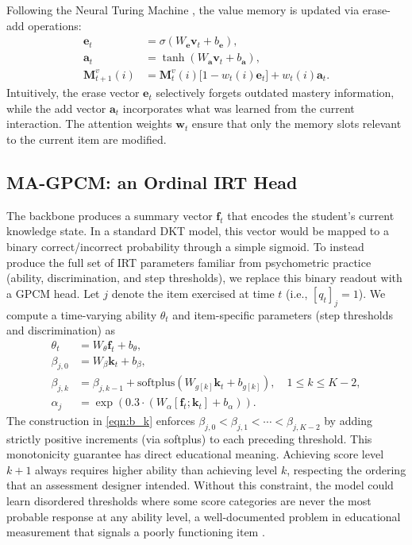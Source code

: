 \documentclass[pdflatex,sn-apa]{sn-jnl}
\begin{document}
Following the Neural Turing Machine \citep{graves_neural_2014}, the value memory is updated via erase-add operations:
\begin{align}
\mathbf{e}_t&=\sigma(W_{\mathbf{e}}\mathbf{v}_t+b_{\mathbf{e}}),\label{eqn:erase_vec}\\
\mathbf{a}_t&=\tanh(W_{\mathbf{a}}\mathbf{v}_t+b_{\mathbf{a}}),\label{eqn:add_vec}\\
\mathbf{M}_{t+1}^v(i)&=\mathbf{M}_{t}^v(i)\bigl[1-w_t(i)\mathbf{e}_t\bigr]+w_t(i)\mathbf{a}_t.\label{eqn:value_memory_update}
\end{align}
Intuitively, the erase vector $\mathbf{e}_t$ selectively forgets outdated mastery information, while the add vector $\mathbf{a}_t$ incorporates what was learned from the current interaction. The attention weights $\mathbf{w}_t$ ensure that only the memory slots relevant to the current item are modified.

\subsection{MA-GPCM: an Ordinal IRT Head}
\label{sec:gpcm_head}
The backbone produces a summary vector $\mathbf{f}_t$ that encodes the student's current knowledge state. In a standard DKT model, this vector would be mapped to a binary correct/incorrect probability through a simple sigmoid. To instead produce the full set of IRT parameters familiar from psychometric practice (ability, discrimination, and step thresholds), we replace this binary readout with a GPCM head.
Let $j$ denote the item exercised at time $t$ (i.e., $[q_t]_j=1$).
We compute a time-varying ability $\theta_t$ and item-specific parameters (step thresholds and discrimination) as
\begin{align}
    \theta_t &= W_{\theta}\mathbf{f}_t+b_{\theta}, \label{eqn:ability_net}\\
    \beta_{j,0} &= W_{\beta}\mathbf{k}_t+b_{\beta}, \label{eqn:b_0}\\
    \beta_{j,k} &= \beta_{j,k-1}+\mathrm{softplus}(W_{g[k]}\mathbf{k}_t+b_{g[k]}),\quad 1\le k\le K-2, \label{eqn:b_k}\\
    \alpha_{j} &= \exp\!\left(0.3\cdot(W_{\alpha}[\mathbf{f}_t;\mathbf{k}_t]+b_{\alpha})\right). \label{eqn:diff_net}
\end{align}
The construction in \eqref{eqn:b_k} enforces $\beta_{j,0}<\beta_{j,1}<\cdots<\beta_{j,K-2}$ by adding strictly positive increments (via softplus) to each preceding threshold. This monotonicity guarantee has direct educational meaning. Achieving score level $k{+}1$ always requires higher ability than achieving level $k$, respecting the ordering that an assessment designer intended. Without this constraint, the model could learn disordered thresholds where some score categories are never the most probable response at any ability level, a well-documented problem in educational measurement that signals a poorly functioning item \citep{wilson_constructing_2005}.
\end{document}
